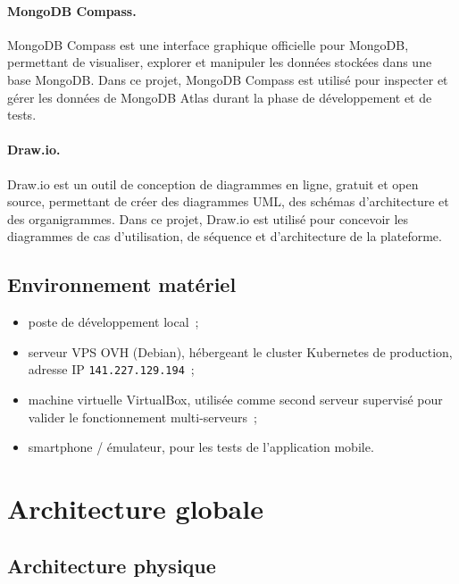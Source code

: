 
\paragraph{MongoDB Compass.} MongoDB Compass est une interface graphique officielle pour MongoDB, permettant de visualiser, explorer et manipuler les données stockées dans une base MongoDB. Dans ce projet, MongoDB Compass est utilisé pour inspecter et gérer les données de MongoDB Atlas durant la phase de développement et de tests.


\paragraph{Draw.io.} Draw.io est un outil de conception de diagrammes en ligne, gratuit et open source, permettant de créer des diagrammes UML, des schémas d'architecture et des organigrammes. Dans ce projet, Draw.io est utilisé pour concevoir les diagrammes de cas d'utilisation, de séquence et d'architecture de la plateforme.


\subsection{Environnement matériel}

\begin{itemize}
  \item poste de développement local~;
  \item serveur VPS OVH (Debian), hébergeant le cluster Kubernetes de production, adresse IP \texttt{141.227.129.194}~;
  \item machine virtuelle VirtualBox, utilisée comme second serveur supervisé pour valider le fonctionnement multi-serveurs~;
  \item smartphone / émulateur, pour les tests de l'application mobile.
\end{itemize}

\section{Architecture globale}

\subsection{Architecture physique}

